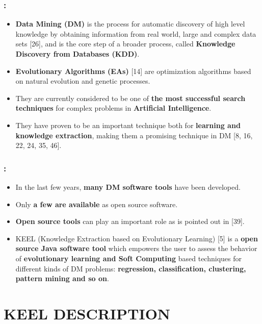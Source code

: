 \documentclass{beamer}
\begin{document}
\begin{CJK*}{UTF8}{bsmi}
\begin{frame}
	\frametitle{\insertsection : \insertsubsection}
	\begin{itemize}
		\item \textbf{Data Mining (DM)} is the process for automatic discovery of high level knowledge by obtaining information from real world, large and complex data sets [26], and is the core step of a broader process, called \textbf{Knowledge Discovery from Databases (KDD)}.
		\item \textbf{Evolutionary Algorithms (EAs)} [14] are optimization algorithms based on natural evolution and genetic processes.
		\item They are currently considered to be one of \textbf{the most successful search techniques} for complex problems in \textbf{Artificial Intelligence}.
		\item They have proven to be an important technique both for \textbf{learning and knowledge extraction}, making them a promising technique in DM [8, 16, 22, 24, 35, 46].
	\end{itemize}
\end{frame}



\begin{frame}
	\frametitle{\insertsection : \insertsubsection}
	\begin{itemize}
		\item In the last few years, \textbf{many DM software tools} have been developed. 
		\item Only \textbf{a few are available} as open source software. 
		\item \textbf{Open source tools} can play an important role as is pointed out in [39].
		\item KEEL (Knowledge Extraction based on Evolutionary Learning) [5] is a \textbf{open source Java software tool} which empowers the user to assess the behavior of \textbf{evolutionary learning and Soft Computing} based techniques for different kinds of DM problems: \textbf{regression, classification, clustering, pattern mining and so on}.
	\end{itemize}
\end{frame}

\section{KEEL DESCRIPTION} 


\end{CJK*}
\end{document}
